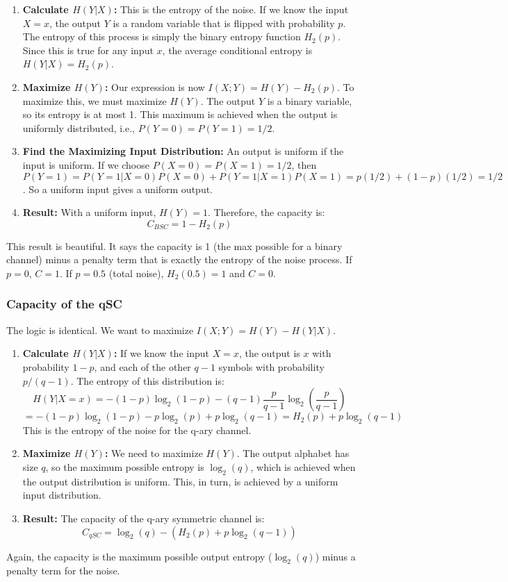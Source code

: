 \begin{enumerate}
    \item \textbf{Calculate $H(Y|X)$:} This is the entropy of the noise. If we know the input $X=x$, the output $Y$ is a random variable that is flipped with probability $p$. The entropy of this process is simply the binary entropy function $H_2(p)$. Since this is true for any input $x$, the average conditional entropy is $H(Y|X) = H_2(p)$.

    \item \textbf{Maximize $H(Y)$:} Our expression is now $I(X;Y) = H(Y) - H_2(p)$. To maximize this, we must maximize $H(Y)$. The output $Y$ is a binary variable, so its entropy is at most 1. This maximum is achieved when the output is uniformly distributed, i.e., $P(Y=0) = P(Y=1) = 1/2$.

    \item \textbf{Find the Maximizing Input Distribution:} An output is uniform if the input is uniform. If we choose $P(X=0)=P(X=1)=1/2$, then $P(Y=1) = P(Y=1|X=0)P(X=0) + P(Y=1|X=1)P(X=1) = p(1/2) + (1-p)(1/2) = 1/2$. So a uniform input gives a uniform output.

    \item \textbf{Result:} With a uniform input, $H(Y)=1$. Therefore, the capacity is:
    \[ C_{BSC} = 1 - H_2(p) \]
\end{enumerate}
This result is beautiful. It says the capacity is 1 (the max possible for a binary channel) minus a penalty term that is exactly the entropy of the noise process. If $p=0$, $C=1$. If $p=0.5$ (total noise), $H_2(0.5)=1$ and $C=0$.

\subsubsection{Capacity of the qSC}

The logic is identical. We want to maximize $I(X;Y) = H(Y) - H(Y|X)$.

\begin{enumerate}
    \item \textbf{Calculate $H(Y|X)$:} If we know the input $X=x$, the output is $x$ with probability $1-p$, and each of the other $q-1$ symbols with probability $p/(q-1)$. The entropy of this distribution is:
    \[ H(Y|X=x) = -(1-p)\log_2(1-p) - (q-1)\frac{p}{q-1}\log_2\left(\frac{p}{q-1}\right) \]
    \[ = -(1-p)\log_2(1-p) - p\log_2(p) + p\log_2(q-1) = H_2(p) + p\log_2(q-1) \]
    This is the entropy of the noise for the q-ary channel.

    \item \textbf{Maximize $H(Y)$:} We need to maximize $H(Y)$. The output alphabet has size $q$, so the maximum possible entropy is $\log_2(q)$, which is achieved when the output distribution is uniform. This, in turn, is achieved by a uniform input distribution.

    \item \textbf{Result:} The capacity of the q-ary symmetric channel is:
    \[ C_{qSC} = \log_2(q) - \left( H_2(p) + p\log_2(q-1) \right) \]
\end{enumerate}
Again, the capacity is the maximum possible output entropy ($\log_2(q)$) minus a penalty term for the noise.
